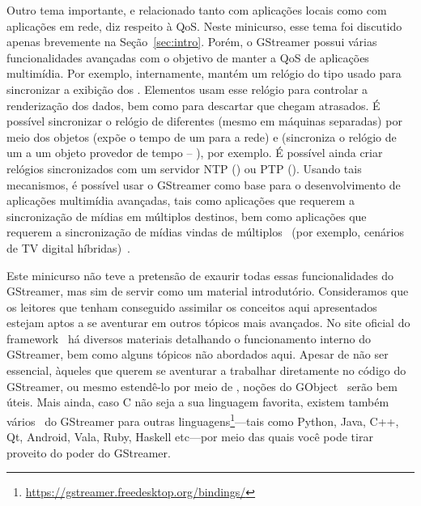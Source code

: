 Outro tema importante, e relacionado tanto com aplicações locais como com
aplicações em rede, diz respeito à QoS.  Neste minicurso, esse tema foi
discutido apenas brevemente na Seção~\ref{sec:intro}.  Porém, o GStreamer possui várias
funcionalidades avançadas com o objetivo de manter a QoS de aplicações
multimídia.  Por exemplo, internamente,  mantém um relógio do
tipo  usado para sincronizar a exibição dos .
Elementos  usam esse relógio para controlar a renderização dos dados,
bem como para descartar  que chegam atrasados. É possível
sincronizar o relógio de  diferentes (mesmo em máquinas
separadas) por meio dos objetos  (expõe o tempo de um
 para a rede) e  (sincroniza o relógio de um
 a um objeto provedor de tempo -- ), por
exemplo. É possível ainda criar relógios sincronizados com um servidor NTP
() ou PTP ().  Usando tais mecanismos, é possível
usar o GStreamer como base para o desenvolvimento de aplicações multimídia
avançadas, tais como aplicações que requerem a sincronização de mídias em
múltiplos destinos, bem como aplicações que requerem a sincronização de
mídias vindas de múltiplos ~(por exemplo, cenários de TV digital
híbridas)~\cite{Cesar-2016}.

Este minicurso não teve a pretensão de exaurir todas essas
funcionalidades do GStreamer, mas sim de servir como um material introdutório.
Consideramos que os leitores que tenham conseguido assimilar os conceitos aqui
apresentados estejam aptos a se aventurar em outros tópicos mais avançados.  No
site oficial do framework~\cite{gstreamer} há diversos materiais detalhando o
funcionamento interno do GStreamer, bem como alguns tópicos não abordados aqui.
Apesar de não ser essencial, àqueles que querem se aventurar a trabalhar 
diretamente no código do GStreamer, ou mesmo estendê-lo por meio de
, noções do  GObject~\cite{glib} serão bem úteis.  
Mais ainda, caso C não seja a sua linguagem favorita, existem também 
vários~ do GStreamer para outras
linguagens\footnote{\url{https://gstreamer.freedesktop.org/bindings/}}---tais 
como Python, Java, C++, Qt, Android, Vala, Ruby, Haskell etc---por meio das
quais você pode tirar proveito do poder do GStreamer.

